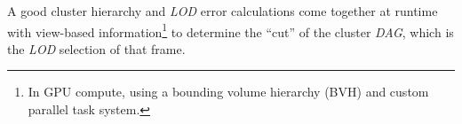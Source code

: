 \documentclass[10pt,journal,compsoc]{IEEEtran}
\begin{document}
\par A good cluster hierarchy and \textit{LOD} error calculations come together at runtime with view-based information\footnote{In GPU compute, using a bounding volume hierarchy (BVH) and custom parallel task system.} to determine the “cut” of the cluster \textit{DAG}, which is the \textit{LOD} selection of that frame.





\end{document}

